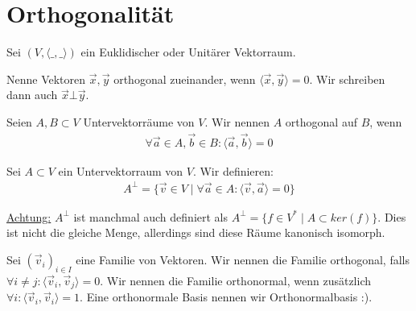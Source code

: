\documentclass{report}
\newcommand*{\newpar}{\par\vspace{\baselineskip}\noindent}
\newcommand{\ul}[1]{\underline{#1}}
\newcommand{\vv}{\vec{v}}
\newcommand{\vx}{\vec{x}}
\newcommand{\vy}{\vec{y}}
\newcommand{\scalar}[2]{\langle #1, #2 \rangle}
\begin{document}
\section{Orthogonalität}
Sei $(V, \scalar{\_}{\_})$ ein Euklidischer oder Unitärer Vektorraum.
\begin{definition}
 Nenne Vektoren $\vx, \vy$ orthogonal zueinander, wenn $\scalar{\vx}{\vy} = 0$. Wir schreiben dann auch $\vx \bot \vy$.
\end{definition}
\begin{definition}
 Seien $A, B \subset V$ Untervektorräume von $V$. Wir nennen $A$ orthogonal auf $B$, wenn
 \begin{align*}
  \forall \vec{a} \in A, \vec{b} \in B : \scalar{\vec{a}}{\vec{b}} = 0
 \end{align*}
\end{definition}
\begin{definition}
 Sei $A \subset V$ ein Untervektorraum von $V$. Wir definieren:
 \begin{align*}
  A^\bot = \{\vv \in V \mid \forall \vec{a} \in A : \scalar{\vv}{\vec{a}} = 0\}
 \end{align*}
\end{definition}
\newpar
\ul{Achtung:} $A^{\bot}$ ist manchmal auch definiert als $A^\bot = \{f \in V^* \mid A \subset ker(f)\}$. Dies ist nicht die gleiche Menge, allerdings sind diese Räume kanonisch isomorph.
\begin{definition}
 Sei $(\vv_i)_{i \in I}$ eine Familie von Vektoren. Wir nennen die Familie orthogonal, falls $\forall i \neq j : \scalar{\vv_i}{\vv_j} = 0$. Wir nennen die Familie orthonormal, wenn zusätzlich $\forall i : \scalar{\vv_i}{\vv_i} = 1$. Eine orthonormale Basis nennen wir Orthonormalbasis :).
\end{definition}


%
%
%
%
%
%
%
%
%
%
%
%
%
%
%
%
%
%
%
%
\appendix
\end{document}
